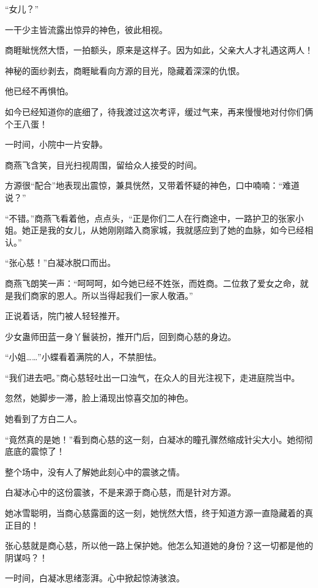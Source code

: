 
\begin{this_body}

“女儿？”

一干少主皆流露出惊异的神色，彼此相视。

商睚眦恍然大悟，一拍额头，原来是这样子。因为如此，父亲大人才礼遇这两人！

神秘的面纱剥去，商睚眦看向方源的目光，隐藏着深深的仇恨。

他已经不再惧怕。

如今已经知道你的底细了，待我渡过这次考评，缓过气来，再来慢慢地对付你们俩个王八蛋！

一时间，小院中一片安静。

商燕飞含笑，目光扫视周围，留给众人接受的时间。

方源很“配合”地表现出震惊，兼具恍然，又带着怀疑的神色，口中喃喃：“难道说？”

“不错。”商燕飞看着他，点点头，“正是你们二人在行商途中，一路护卫的张家小姐。她正是我的女儿，从她刚刚踏入商家城，我就感应到了她的血脉，如今已经相认。”

“张心慈！”白凝冰脱口而出。

商燕飞朗笑一声：“呵呵呵，如今她已经不姓张，而姓商。二位救了爱女之命，就是我们商家的恩人。所以当得起我们一家人敬酒。”

正说着话，院门被人轻轻推开。

少女蛊师田蓝一身丫鬟装扮，推开门后，回到商心慈的身边。

“小姐……”小蝶看着满院的人，不禁胆怯。

“我们进去吧。”商心慈轻吐出一口浊气，在众人的目光注视下，走进庭院当中。

忽然，她脚步一滞，脸上涌现出惊喜交加的神色。

她看到了方白二人。

“竟然真的是她！”看到商心慈的这一刻，白凝冰的瞳孔骤然缩成针尖大小。她彻彻底底的震惊了！

整个场中，没有人了解她此刻心中的震骇之情。

白凝冰心中的这份震骇，不是来源于商心慈，而是针对方源。

她冰雪聪明，当商心慈露面的这一刻，她恍然大悟，终于知道方源一直隐藏着的真正目的！

张心慈就是商心慈，所以他一路上保护她。他怎么知道她的身份？这一切都是他的阴谋吗？！

一时间，白凝冰思绪澎湃。心中掀起惊涛骇浪。


\end{this_body}
